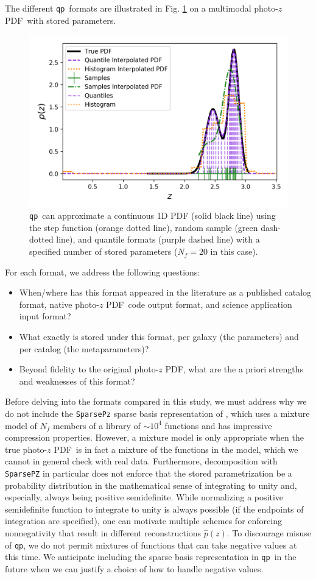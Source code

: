 \documentclass[\docopts]{\docclass}
\newcommand{\qp}{\texttt{qp}}
\newcommand{\pz}{photo-$z$ PDF}
\begin{document}
The different \qp\ formats are illustrated in Fig. \ref{fig:qp} on a multimodal
\pz\ with stored parameters.
\begin{figure}
  \includegraphics[width=0.9\columnwidth]{figures/demo_pz.png}
  \caption{\qp\ can approximate a continuous 1D PDF (solid black line) using
the step function (orange dotted line), random sample (green dash-dotted line),
and quantile formats (purple dashed line) with a specified number of stored
parameters ($N_{f}=20$ in this case).
  \label{fig:qp}}
\end{figure}
For each format, we address the following questions:
\begin{itemize}
  \item When/where has this format appeared in the literature as a published
catalog format, native \pz\ code output format, and science application input
format?
  \item What exactly is stored under this format, per galaxy (the parameters)
and per catalog (the metaparameters)?
  \item Beyond fidelity to the original \pz, what are the a priori strengths
and weaknesses of this format?
\end{itemize}

Before delving into the formats compared in this study, we must address why we
do not include the \texttt{SparsePz} sparse basis representation of
\citet{carrasco_kind_sparse_2014}, which uses a mixture model of $N_{f}$
members of a library of $\sim10^{4}$ functions and has impressive compression
properties.  However, a mixture model is only appropriate when the true \pz\ is
in fact a mixture of the functions in the model, which we cannot in general
check with real data.  Furthermore, decomposition with \texttt{SparsePZ} in
particular does not enforce that the stored parametrization be a probability
distribution in the mathematical sense of integrating to unity and, especially,
always being positive semidefinite.  While normalizing a positive semidefinite
function to integrate to unity is always possible (if the endpoints of
integration are specified), one can motivate multiple schemes for enforcing
nonnegativity that result in different reconstructions $\hat{p}(z)$.  To
discourage misuse of \qp, we do not permit mixtures of functions that can take
negative values at this time.  We anticipate including the sparse basis
representation in \qp\ in the future when we can justify a choice of how to
handle negative values.
\end{document}
